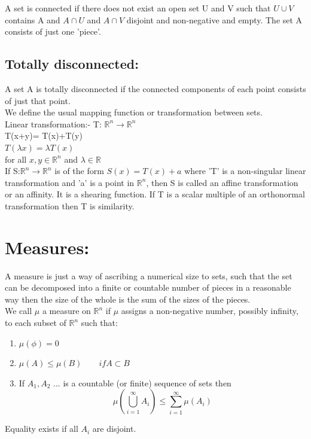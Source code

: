 \documentclass[14pt]{extarticle}
\begin{document}
\begin{enumerate}
A set is connected if there does not exist an open set U and V such that $U \cup V$ contains A and $A \cap U$ and $A \cap V$ disjoint and non-negative and empty. The set A consists of just one 'piece'. 

\subsection{Totally disconnected:}

A set A is totally disconnected if the connected components of each point consists of just that point.\\

We define the usual mapping function or transformation between sets.\\
Linear transformation:- T: $\mathbb{R}^n \rightarrow \mathbb{R}^n$\\
T(x+y)= T(x)+T(y)\\
$T(\lambda x)= \lambda T(x)$\\
for all $x,y \in \mathbb{R}^n$ and $\lambda \in \mathbb{R}$\\

If S:$\mathbb{R}^n \rightarrow \mathbb{R}^n$ is of the form $S(x)=T(x)+a$ where 'T' is a non-singular linear transformation and 'a' is a point in $\mathbb{R}^n$, then S is called an affine transformation or an affinity. It is a shearing function. If T is a scalar multiple of an orthonormal transformation then T is similarity.
\pagebreak

\section{Measures:}

A measure is just a way of ascribing a numerical size to sets, such that the set can be decomposed into a finite or countable number of pieces in a reasonable way then the size of the whole is the sum of the sizes of the pieces.\\

We call $\mu$ a measure on $\mathbb{R}^n$ if $\mu$  assigns a non-negative number, possibly infinity, to each subset of $\mathbb{R}^n$ such that:\\

\begin{enumerate}
\item $\mu(\phi)=0$
\item $\mu(A) \leq \mu(B) \quad \quad if A \subset B$
\item If $A_1, A_2$ ... is a countable (or finite) sequence of sets then\\

$$\mu \left( \bigcup_{i=1}^{\infty} A_i \right) \leq \sum_{i=1}^{\infty} \mu(A_i)$$
\end{enumerate}
Equality exists if all $A_i$ are disjoint.\\
\end{enumerate}
\end{document}
